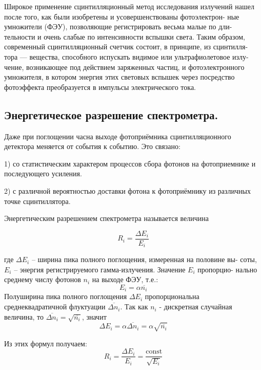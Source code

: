 \documentclass[%
 reprint,
 amsmath,amssymb,
 aps,
]{revtex4-2}
\begin{document}
Широкое применение сцинтилляционный метод исследования излучений
нашел после того, как были изобретены и усовершенствованы фотоэлектрон-
ные умножители (ФЭУ), позволяющие регистрировать весьма малые по дли-
тельности и очень слабые по интенсивности вспышки света. Таким образом,
современный сцинтилляционный счетчик состоит, в принципе, из сцинтилля-
тора — вещества, способного испускать видимое или ультрафиолетовое излу-
чение, возникающее под действием заряженных частиц, и фотоэлектронного
умножителя, в котором энергия этих световых вспышек через посредство
фотоэффекта преобразуется в импульсы электрического тока.

\subsection{Энергетическое разрешение спектрометра.}
Даже при поглощении часна выходе фотоприёмника
сцинтилляционного детектора меняется от события к событию. Это связано:

1) со статистическим характером процессов сбора фотонов на фотоприемнике и последующего усиления.

2) с различной вероятностью доставки фотона к фотоприёмнику из различных точке сцинтиллятора.

Энергетическим разрешением спектрометра называется величина

\begin{equation}
R_i = \frac{\Delta E_i}{E_i}
\end{equation}

где $\Delta E_i$ – ширина пика полного поглощения, измеренная на половине вы-
соты, $E_i$ – энергия регистрируемого гамма-излучения. Значение $E_i$ пропорцио-
нально среднему числу фотонов $n_i$ на выходе ФЭУ, т.е.:
\begin{equation}
E_i = \alpha\overline{n_i}
\end{equation}
Полуширина пика полного поглощения $\Delta E_i$ пропорциональна среднеквадратичной флуктуации $\overline{\Delta n_i}$. Так как $n_i$ - дискретная случайная величина, то  $\overline{\Delta n_i} = \sqrt{\overline{n_i}}$, значит 
\begin{equation}
\Delta E_i = \alpha\overline{\Delta n_i} = \alpha\sqrt{\overline{n_i}}	
\end{equation}

Из этих формул получаем:
\begin{equation}
R_i = \frac{\Delta E_i}{E_i} = \frac{\text{const}}{\sqrt{E_i}}
\end{equation}
\end{document}
